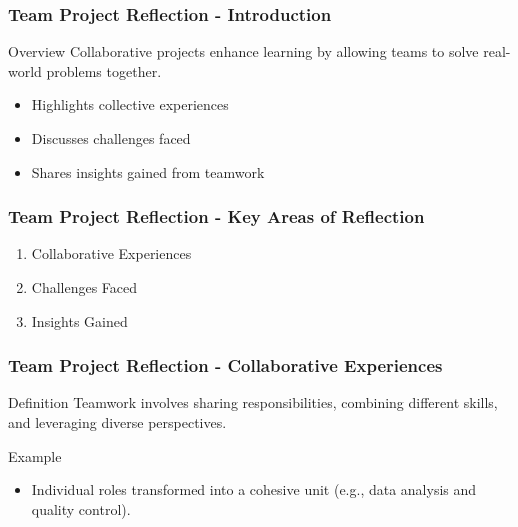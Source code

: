 \documentclass[aspectratio=169]{beamer}
\begin{document}
\begin{frame}[fragile]
    \frametitle{Team Project Reflection - Introduction}
    \begin{block}{Overview}
        Collaborative projects enhance learning by allowing teams to solve real-world problems together.
    \end{block}
    \begin{itemize}
        \item Highlights collective experiences
        \item Discusses challenges faced
        \item Shares insights gained from teamwork
    \end{itemize}
\end{frame}

\begin{frame}[fragile]
    \frametitle{Team Project Reflection - Key Areas of Reflection}
    \begin{enumerate}
        \item Collaborative Experiences
        \item Challenges Faced
        \item Insights Gained
    \end{enumerate}
\end{frame}

\begin{frame}[fragile]
    \frametitle{Team Project Reflection - Collaborative Experiences}
    \begin{block}{Definition}
        Teamwork involves sharing responsibilities, combining different skills, and leveraging diverse perspectives.
    \end{block}
    \begin{exampleblock}{Example}
        \begin{itemize}
            \item Individual roles transformed into a cohesive unit (e.g., data analysis and quality control).
        \end{itemize}
    \end{exampleblock}
\end{frame}
\end{document}
